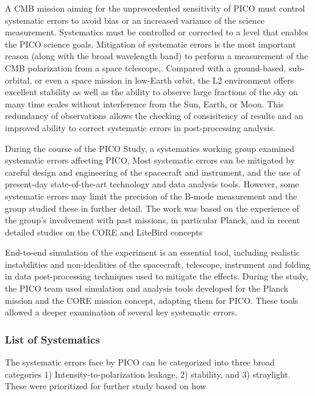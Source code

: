 \documentclass[PICOReport.tex]{subfiles}
\begin{document}
A CMB mission aiming for the unprescedented sensitivity of PICO must control
systematic errors to avoid bias or an increased variance of the
science measurement.   
Systematics must be controlled or corrected to a level that enables the PICO
science goals.
Mitigation of systematic errors is the most important reason (along with the broad
wavelength band) to perform a measurement of the CMB polarization from a space telescope,.
Compared with a ground-based, sub-orbital, or even a space mission in
low-Earth orbit, the L2 environment offers excellent stability as well
as the ability to observe large fractions of the sky on many time
scales without interference from the Sun, Earth, or Moon.
This redundancy of observations allows the checking of consisitency of
results and an improved ability to correct systematic errors in
post-processing analysis.

During the course of the PICO Study, a systematics working group
examined systematic errors affecting PICO,
Most  systematic errors can be mitigated by careful design and engineering of 
the spacecraft and instrument, and the use of present-day state-of-the-art
technology and data analysis tools.   
However, some systematic errors may
limit the precision of the B-mode measurement and the group studied
these in further detail. 
The work was based on the experience of the group's involvement with
past missions, in particular Planck, and in recent detailed studies on
the CORE and LiteBird  concepts

End-to-end simulation of the experiment is an essential tool,
including realistic instabilities and non-idealities of the spacecraft,
telescope, instrument and folding in data post-processing techniques
used to mitigate the effects.  During the study, the PICO team used 
 simulation and analysis tools developed for the Planck mission\cite{plank2015_xii_focalplane} and 
the CORE mission concept, adapting them for PICO.  These tools allowed
a deeper examination of several key systematic errors. 

\subsubsection{List of Systematics}
The systematic errors face by PICO can be categorized into three broad categories 
1) Intensity-to-polarization leakage, 2) stability, and 3)
straylight.    These were prioritized for further study based on how 
\end{document}
